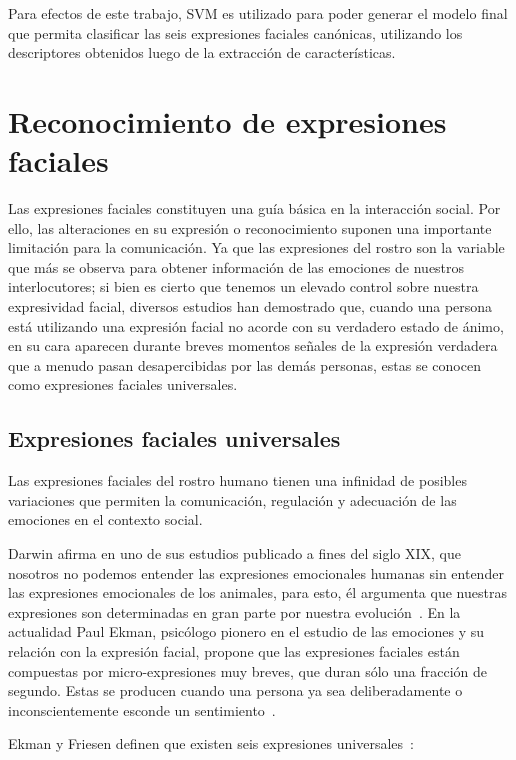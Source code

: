 Para efectos de este trabajo, SVM es utilizado para poder generar el modelo final que permita clasificar las seis expresiones faciales canónicas, utilizando los descriptores obtenidos luego de la extracción de características.

\section{Reconocimiento de expresiones faciales}
\label{sec:fer}
Las expresiones faciales constituyen una guía básica en la interacción social. Por ello, las alteraciones en su expresión o reconocimiento suponen una importante limitación para la comunicación. Ya que las expresiones del rostro son la variable que más se observa para obtener información de las emociones de nuestros interlocutores; si bien es cierto que tenemos un elevado control sobre nuestra expresividad facial, diversos estudios han demostrado que, cuando una persona está utilizando una expresión facial no acorde con su verdadero estado de ánimo, en su cara aparecen durante breves momentos señales de la expresión verdadera que a menudo pasan desapercibidas por las demás personas, estas se conocen como expresiones faciales universales.


\subsection{Expresiones faciales universales}
\label{sec:type_fe}

Las expresiones faciales del rostro humano tienen una infinidad de posibles variaciones que permiten la comunicación, regulación y adecuación de las emociones en el contexto social.

Darwin afirma en uno de  sus estudios publicado a fines del siglo XIX, que nosotros no podemos entender las expresiones emocionales humanas sin entender las expresiones emocionales de los animales, para esto, él argumenta que nuestras expresiones son determinadas en gran parte por nuestra evolución~\cite{Darwin1956,Darwin1998}. En la actualidad Paul Ekman, psicólogo pionero en el estudio de las emociones y su relación con la expresión facial, propone que las expresiones faciales están compuestas por micro-expresiones muy breves, que duran sólo una fracción de segundo. Estas se producen cuando una persona ya sea deliberadamente o inconscientemente esconde un sentimiento~\cite{Ekman1981}.

Ekman y Friesen definen que existen seis expresiones universales~\cite{Ekman2003}: 

